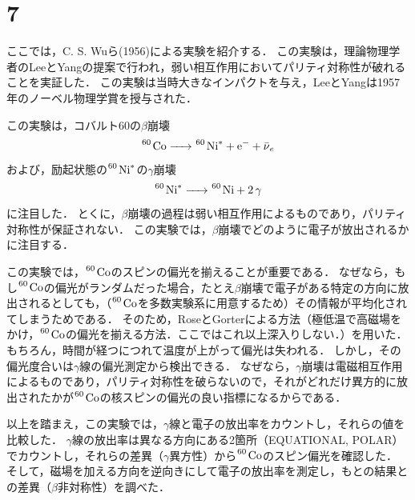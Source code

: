 \section*{7}
ここでは，C. S. Wuら(1956)による実験を紹介する．
この実験は，理論物理学者のLeeとYangの提案で行われ，弱い相互作用においてパリティ対称性が破れることを実証した．
この実験は当時大きなインパクトを与え，LeeとYangは1957年のノーベル物理学賞を授与された．

この実験は，コバルト60の$\beta$崩壊
\begin{equation}
  \ce{^60 Co -> ^60 Ni^* + e^- + \bar{\nu}_e}
\end{equation}
および，励起状態の$\ce{^60 Ni^*}$の$\gamma$崩壊
\begin{equation}
  \ce{^60 Ni^* -> ^60 Ni + 2\gamma}
\end{equation}
に注目した．
とくに，$\beta$崩壊の過程は弱い相互作用によるものであり，パリティ対称性が保証されない．
この実験では，$\beta$崩壊でどのように電子が放出されるかに注目する．

この実験では，$\ce{^60 Co}$のスピンの偏光を揃えることが重要である．
なぜなら，もし$\ce{^60 Co}$の偏光がランダムだった場合，たとえ$\beta$崩壊で電子がある特定の方向に放出されるとしても，（$\ce{^60 Co}$を多数実験系に用意するため）その情報が平均化されてしまうためである．
そのため，RoseとGorterによる方法（極低温で高磁場をかけ，$\ce{^60 Co}$の偏光を揃える方法．ここではこれ以上深入りしない．）を用いた．
もちろん，時間が経つにつれて温度が上がって偏光は失われる．
しかし，その偏光度合いは$\gamma$線の偏光測定から検出できる．
なぜなら，$\gamma$崩壊は電磁相互作用によるものであり，パリティ対称性を破らないので，それがどれだけ異方的に放出されたかが$\ce{^60 Co}$の核スピンの偏光の良い指標になるからである．

以上を踏まえ，この実験では，$\gamma$線と電子の放出率をカウントし，それらの値を比較した．
$\gamma$線の放出率は異なる方向にある2箇所（EQUATIONAL, POLAR）でカウントし，それらの差異（$\gamma$異方性）から$\ce{^60 Co}$のスピン偏光を確認した．
そして，磁場を加える方向を逆向きにして電子の放出率を測定し，もとの結果との差異（$\beta$非対称性）を調べた．

